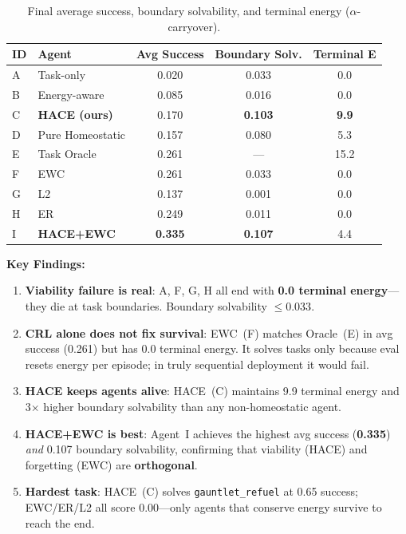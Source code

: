 \documentclass[11pt]{article}
\begin{document}
\begin{table}[h]
\centering\small
\caption{Final average success, boundary solvability, and terminal energy ($\alpha$-carryover).}
\vspace{2pt}
\begin{tabular}{@{}llccc@{}}
\toprule
\textbf{ID} & \textbf{Agent} & \textbf{Avg Success} & \textbf{Boundary Solv.} & \textbf{Terminal E} \\
\midrule
A & Task-only           & 0.020 & 0.033 & 0.0 \\
B & Energy-aware        & 0.085 & 0.016 & 0.0 \\
C & \textbf{HACE (ours)} & 0.170 & \textbf{0.103} & \textbf{9.9} \\
D & Pure Homeostatic    & 0.157 & 0.080 & 5.3 \\
E & Task Oracle         & 0.261 & ---   & 15.2 \\
F & EWC                 & 0.261 & 0.033 & 0.0 \\
G & L2                  & 0.137 & 0.001 & 0.0 \\
H & ER                  & 0.249 & 0.011 & 0.0 \\
I & \textbf{HACE+EWC}   & \textbf{0.335} & \textbf{0.107} & 4.4 \\
\bottomrule
\end{tabular}
\end{table}

\textbf{Key Findings:}
\begin{enumerate}[leftmargin=*, itemsep=1pt, topsep=2pt]
\item \textbf{Viability failure is real}: A, F, G, H all end with \textbf{0.0 terminal energy}---they die at task boundaries. Boundary solvability $\leq 0.033$.
\item \textbf{CRL alone does not fix survival}: EWC~(F) matches Oracle~(E) in avg success (0.261) but has 0.0 terminal energy. It solves tasks only because eval resets energy per episode; in truly sequential deployment it would fail.
\item \textbf{HACE keeps agents alive}: HACE~(C) maintains 9.9 terminal energy and 3$\times$ higher boundary solvability than any non-homeostatic agent.
\item \textbf{HACE+EWC is best}: Agent~I achieves the highest avg success (\textbf{0.335}) \emph{and} 0.107 boundary solvability, confirming that viability (HACE) and forgetting (EWC) are \textbf{orthogonal}.
\item \textbf{Hardest task}: HACE~(C) solves \texttt{gauntlet\_refuel} at 0.65 success; EWC/ER/L2 all score 0.00---only agents that conserve energy survive to reach the end.
\end{enumerate}
\end{document}
